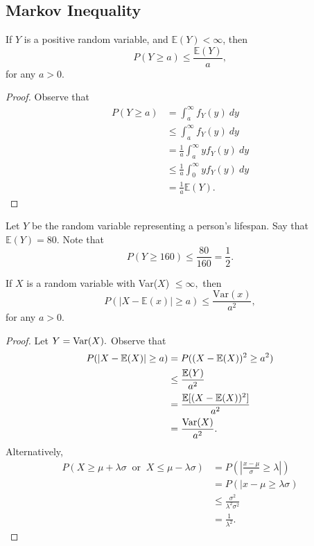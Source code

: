 
\subsection{Markov Inequality}

\begin{theorem}
If $Y$ is a positive random variable, and $\mathbb E(Y)<\infty$, then 
$$P(Y\geq a)\leq \frac{\mathbb E(Y)}{a},$$
for any $a>0$.
\end{theorem}
\begin{proof}
Observe that
\begin{align*}
    P(Y\geq a) &= \int^\infty_a f_Y(y)\ dy\\
    &\leq \int^\infty_af_Y(y) \ dy \\
    &=\frac{1}{a}\int^\infty_a y f_Y(y) \ dy\\
	&\leq \frac{1}{a}\int^\infty_0yf_Y(y) \ dy \\
    &=\frac{1}{a}\mathbb E(Y).
\end{align*}
\end{proof}

\begin{eg}
Let $Y$ be the random variable representing a person's lifespan. Say that $\mathbb E(Y)=80.$ 
Note that 
$$
P(Y\geq 160)\leq \frac{80}{160}=\frac{1}{2}.
$$
\end{eg}

\begin{theorem}
If $X$ is a random variable with Var($X$) $\leq \infty,$ then 
$$
P(|X-\mathbb E(x)|\geq a)\leq \frac{\text{Var}(x)}{a^2},
$$
for any $a>0$.
\end{theorem}
\begin{proof}
Let $Y=\operatorname*{Var}(X).$ Observe that
\begin{align*}
    P(|X-\mathbb E(X)|\geq a)&=P((X-\mathbb E(X))^2\geq a^2) \\
    &\leq \frac{\mathbb E(Y)}{a^2}\\
    &=\frac{\mathbb E[(X-\mathbb E(X))^2]}{a^2}\\
    &=\frac{\operatorname*{Var}(X)}{a^2}.
\end{align*}
Alternatively,
\begin{align*}
    P(X\geq \mu +\lambda \sigma \ \text{ or } \ X \leq \mu -\lambda \sigma)
    &= P\left(\left|\frac{x-\mu}{\sigma}\geq \lambda \right|\right) \\
    &=P\left(|x-\mu \geq \lambda \sigma\right) \\
	&\leq \frac{\sigma^2}{\lambda^2\sigma^2} \\
    &=\frac{1}{\lambda^2}.
\end{align*}
\end{proof}

